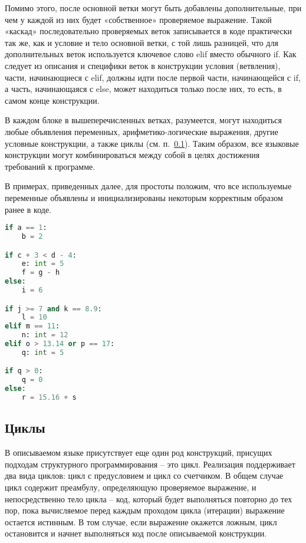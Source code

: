 Помимо этого, после основной ветки могут быть добавлены дополнительные, при чем у каждой из них будет «собственное» проверяемое выражение.
Такой «каскад» последовательно проверяемых веток записывается в коде практически так же, как и условие и тело основной ветки, с той лишь разницей, что для дополнительных веток используется ключевое слово elif вместо обычного if. Как следует из описания и специфики веток в конструкции условия (ветвления), части, начинающиеся с elif, должны идти после первой части, начинающейся с if, а часть, начинающаяся с else, может находиться только после них, то есть, в самом конце конструкции.

В каждом блоке в вышеперечисленных ветках, разумеется, могут находиться любые объявления переменных, арифметико-логические выражения, другие условные конструкции, а также циклы (см. п.~\ref{sec:loops}).
Таким образом, все языковые конструкции могут комбинироваться между собой в целях достижения требований к программе.

В примерах, приведенных далее, для простоты положим, что все используемые переменные объявлены и инициализированы некоторым корректным образом ранее в коде.

\begin{lstlisting}[language=Python, caption=Примеры условных конструкций]
if a == 1:
    b = 2

if c + 3 < d - 4:
    e: int = 5
    f = g - h
else:
    i = 6

if j >= 7 and k == 8.9:
    l = 10
elif m == 11:
    n: int = 12
elif o > 13.14 or p == 17:
    q: int = 5

if q > 0:
    q = 0
else:
    r = 15.16 + s
\end{lstlisting}

\subsection{Циклы}
\label{sec:loops}

В описываемом языке присутствует еще один род конструкций, присущих подходам структурного программирования -- это цикл.
Реализация поддерживает два вида циклов: цикл с предусловием и цикл со счетчиком. В общем случае цикл содержит преамбулу, определяющую проверяемое выражение, и непосредственно тело цикла -- код, который будет выполняться повторно до тех пор, пока вычисляемое перед каждым проходом цикла (итерации) выражение остается истинным.
В том случае, если выражение окажется ложным, цикл остановится и начнет выполняться код после описываемой конструкции.

